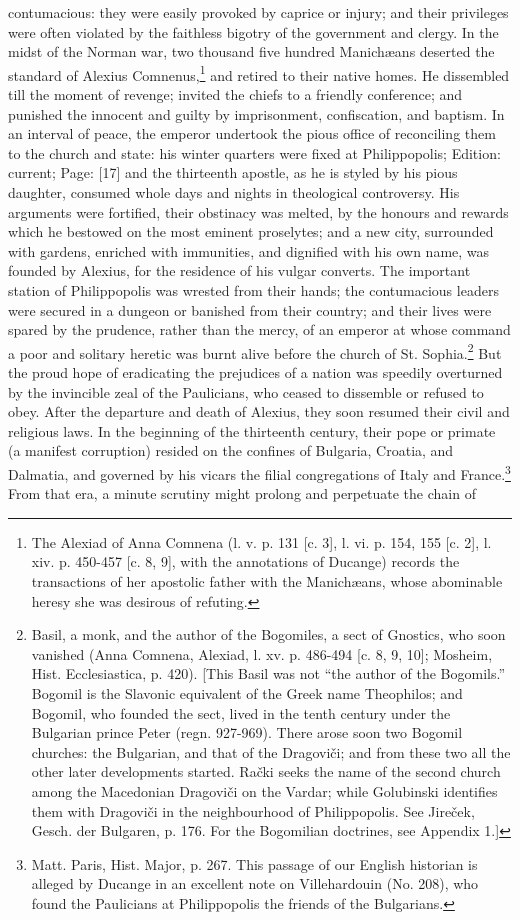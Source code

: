 contumacious: they were easily provoked by caprice or injury; and their privileges were often violated by the faithless bigotry of the government and clergy. In the midst of the Norman war, two thousand five hundred Manichæans deserted the standard of Alexius Comnenus,\footnote{The Alexiad of Anna Comnena (l. v. p. 131 [c. 3], l. vi. p. 154, 155 [c. 2], l. xiv. p. 450-457 [c. 8, 9], with the annotations of Ducange) records the transactions of her apostolic father with the Manichæans, whose abominable heresy she was desirous of refuting.} and retired to their native homes. He dissembled till the moment of revenge; invited the chiefs to a friendly conference; and punished the innocent and guilty by imprisonment, confiscation, and baptism. In an interval of peace, the emperor undertook the pious office of reconciling them to the church and state: his winter quarters were fixed at Philippopolis; Edition: current; Page: [17] and the thirteenth apostle, as he is styled by his pious daughter, consumed whole days and nights in theological controversy. His arguments were fortified, their obstinacy was melted, by the honours and rewards which he bestowed on the most eminent proselytes; and a new city, surrounded with gardens, enriched with immunities, and dignified with his own name, was founded by Alexius, for the residence of his vulgar converts. The important station of Philippopolis was wrested from their hands; the contumacious leaders were secured in a dungeon or banished from their country; and their lives were spared by the prudence, rather than the mercy, of an emperor at whose command a poor and solitary heretic was burnt alive before the church of St. Sophia.\footnote{Basil, a monk, and the author of the Bogomiles, a sect of Gnostics, who soon vanished (Anna Comnena, Alexiad, l. xv. p. 486-494 [c. 8, 9, 10]; Mosheim, Hist. Ecclesiastica, p. 420). [This Basil was not \texthebrew{“}the author of the Bogomils.\texthebrew{}” Bogomil is the Slavonic equivalent of the Greek name Theophilos; and Bogomil, who founded the sect, lived in the tenth century under the Bulgarian prince Peter (regn. 927-969). There arose soon two Bogomil churches: the Bulgarian, and that of the Dragoviči; and from these two all the other later developments started. Rački seeks the name of the second church among the Macedonian Dragoviči on the Vardar; while Golubinski identifies them with Dragoviči in the neighbourhood of Philippopolis. See Jireček, Gesch. der Bulgaren, p. 176. For the Bogomilian doctrines, see Appendix 1.]} But the proud hope of eradicating the prejudices of a nation was speedily overturned by the invincible zeal of the Paulicians, who ceased to dissemble or refused to obey. After the departure and death of Alexius, they soon resumed their civil and religious laws. In the beginning of the thirteenth century, their pope or primate (a manifest corruption) resided on the confines of Bulgaria, Croatia, and Dalmatia, and governed by his vicars the filial congregations of Italy and France.\footnote{Matt. Paris, Hist. Major, p. 267. This passage of our English historian is alleged by Ducange in an excellent note on Villehardouin (No. 208), who found the Paulicians at Philippopolis the friends of the Bulgarians.} From that era, a minute scrutiny might prolong and perpetuate the chain of 